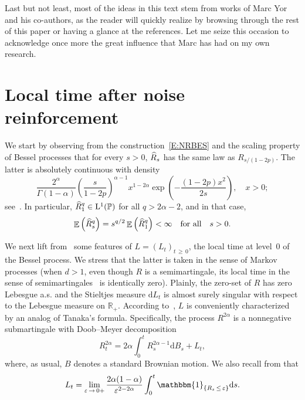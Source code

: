 \documentclass[AHL,Unicode,longabstracts,published]{cedram}
\newcommand{\ind}[1]{\mathbbm{1}_{\left\{#1\right\}}}
\renewcommand{\hat}[1]{\widehat{#1}}
\newcommand{\dd}{\mathrm{d}}
\newcommand{\rmL}{\mathrm{L}}
\DeclareMathOperator{\E}{\mathbb{E}}
\renewcommand{\P}{\mathbb{P}}
\newcommand{\R}{\mathbb{R}}
\let\oldhat\hat
\renewcommand*{\hat}[1]{\mathchoice{\widehat{#1}}{\widehat{#1}}{\oldhat{#1}}{\oldhat{#1}}}
\begin{document}
Last but not least, most of the ideas in this text stem from works of Marc Yor and his co-authors, as the reader will quickly realize by browsing through the rest of this paper or having a glance at the references. Let me seize this occasion to acknowledge once more the great influence that Marc has had on my own research.


\section{Local time after noise reinforcement}\label{sec:RLT}
We start by observing from the construction~\eqref{E:NRBES} and the scaling property of Bessel processes that for every $s> 0$, $\hat R_s$ has the same law as $R_{s/(1-2p)}$. The latter is absolutely continuous with density
\begin{equation}\label{E:Besdens}
\frac{2^{\alpha}}{ \Gamma(1-\alpha)}\left(\frac{s}{1-2p}\right)^{\alpha-1} x^{1-2\alpha} \exp\left (-\frac{(1-2p)x^2}{2s}\right), \quad x>0;
\end{equation}
see~\cite[p.~446]{RY}. In particular, $\hat R_1^q\in \rmL^1(\P)$ for all $q>2\alpha-2$, and in that case,
\begin{equation}\label{E:momBes}
\E\left(\hat R_s^q\right)=s^{q/2} \E\left(\hat R_1^q\right)<\infty \quad \text{for all}\quad s> 0.
\end{equation}


We next lift from~\cite{DRVY} some features of ${L}=({L}_t)_{t\,\geq\,0}$, the local time at level~$0$ of the Bessel process. We stress that the latter is taken in the sense of Markov processes (when $d>1$, even though $R$ is a semimartingale, its local time in the sense of semimartingales~\cite[Chapter~VI]{RY} is identically zero). Plainly, the zero-set of $R$ has zero Lebesgue a.s. and the Stieltjes measure $\dd {L}_t$ is almost surely singular with respect to the Lebesgue measure on $\R_+$. According to~\cite[Theorem~2.1]{DRVY}, ${L}$ is conveniently characterized by an analog of Tanaka's formula. Specifically, the process $R^{2 \alpha}$ is a nonnegative submartingale with Doob--Meyer decomposition
\begin{equation}\label{E:Tanaka}
R^{2 \alpha}_t = 2\alpha \int_0^t R^{2\alpha-1}_s \dd B_s+ {L}_t,
\end{equation}
where, as usual, $B$ denotes a standard Brownian motion. We also recall from \cite[Propo\-sition~3.1]{DRVY} that
\begin{equation}\label{E:TLO}
{L}_t=\lim_{\varepsilon\,\to\,0+} \frac{2\alpha(1-\alpha)}{\varepsilon^{2-2\alpha} } \int_0^t \ind{R_s\,\leq\,\varepsilon} \dd s.
\end{equation}
\end{document}
